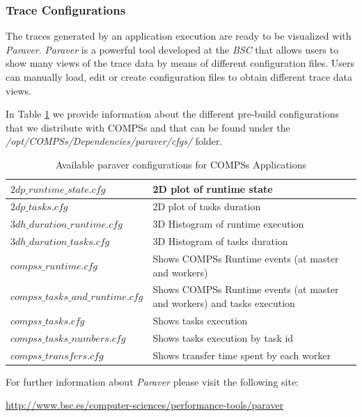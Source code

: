 \subsubsection{Trace Configurations}
The traces generated by an application execution are ready to be visualized with \textit{Paraver}. \textit{Paraver} is a powerful 
tool developed at the \textit{BSC} that allows users to show many views of the trace data by means of different configuration files.
Users can manually load, edit or create configuration files to obtain different trace data views.

In Table \ref{tab:paraver_configs} we provide information about the different pre-build configurations that we distribute
with COMPSs and that can be found under the \textit{/opt/COMPSs/Dependencies/paraver/cfgs/} folder.

\bgroup
  \def\arraystretch{1.5}
  \begin{table}[h]
    \begin{center}
      \begin{tabular}{| p{} | p{} |}
	\hline
	$2dp\_runtime\_state.cfg$		& 2D plot of runtime state \\ \hline
	$2dp\_tasks.cfg$			& 2D plot of tasks duration \\ \hline
	$3dh\_duration\_runtime.cfg$		& 3D Histogram of runtime execution \\ \hline
	$3dh\_duration\_tasks.cfg$		& 3D Histogram of tasks duration \\ \hline
	$compss\_runtime.cfg$ 			& Shows COMPSs Runtime events (at master and workers) \\ \hline
	$compss\_tasks\_and\_runtime.cfg$ 	& Shows COMPSs Runtime events (at master and workers) and tasks execution \\ \hline
	$compss\_tasks.cfg$ 			& Shows tasks execution \\ \hline
	$compss\_tasks\_numbers.cfg$ 		& Shows tasks execution by task id \\ \hline
	$compss\_transfers.cfg$ 		& Shows transfer time spent by each worker \\ \hline
      \end{tabular}
      \caption{Available paraver configurations for COMPSs Applications}
      \label{tab:paraver_configs}
    \end{center}
  \end{table}
\egroup

For further information about \textit{Paraver} please visit the following site:
\begin{center}
\url{http://www.bsc.es/computer-sciences/performance-tools/paraver}
\end{center}


